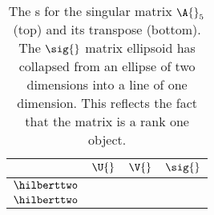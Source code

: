 \clearpage
\thispagestyle{empty}
\begin{landscape}
\begin{table}[htdp]
\caption[The \asvd s for the singular matrix $\A{}_{5}$]{The \asvd s for the singular matrix $\A{}_{5}$ (top) and its transpose (bottom). The $\sig{}$ matrix ellipsoid has collapsed from an ellipse of two dimensions into a line of one dimension. This reflects the fact that the matrix is a rank one object.}
\begin{center}
\begin{tabular}{lccc}
%
  & $\U{}$ & \quad $\V{}$ & \quad $\sig{}$ \\[10pt]\hline
%
$\hilberttwo$ &
\raisebox{-0.5\height}{\includegraphics[ width = 1.5in ] {images/bases/pies/"A5 U"}}  & \quad
\raisebox{-0.5\height}{\includegraphics[ width = 1.5in ] {images/bases/pies/"A5 V"}} & \quad
\raisebox{-0.5\height}{\includegraphics[ width = 3.0in ] {images/bases/pies/"A5 S"}} \\[10pt]
%
$\hilberttwo$ &
\raisebox{-0.5\height}{\includegraphics[ width = 1.5in ] {images/bases/pies/"A5T U"}}  & \quad
\raisebox{-0.5\height}{\includegraphics[ width = 1.5in ] {images/bases/pies/"A5T V"}} & \quad
\raisebox{-0.5\height}{\includegraphics[ width = 3.0in ] {images/bases/pies/"A5  S"}} 
%
\end{tabular}
\end{center}
\label{tab:pie:a5}
\end{table}
\end{landscape}

\endinput